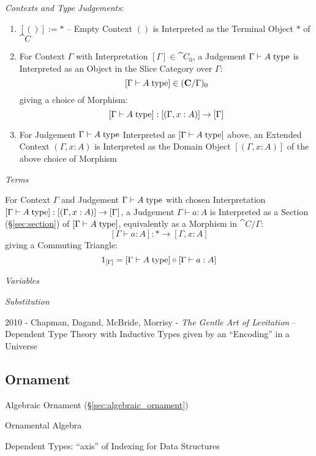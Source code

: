 \emph{Contexts and Type Judgements}:
\begin{enumerate}
  \item $[()] := *$ -- Empty Context $()$ is Interpreted as the
    Terminal Object $*$ of $\cat{C}$
  \item For Context $\Gamma$ with Interpretation $[\Gamma] \in
    \cat{C}_0$, a Judgement $\Gamma \vdash A\;\mathrm{type}$ is Interpreted
    as an Object in the Slice Category over $\Gamma$:
    \[
      [\Gamma \vdash A\;\mathrm{type}] \in (\mathbf{C}/\Gamma)_0
    \]
    giving a choice of Morphism:
    \[
      [\Gamma \vdash A\;\mathrm{type}] : [(\Gamma,x:A)] \rightarrow [\Gamma]
    \]
  \item For Judgement $\Gamma \vdash A\;\mathrm{type}$ Interpreted as $[\Gamma
    \vdash A\;\mathrm{type}]$ above, an Extended Context $(\Gamma,x:A)$ is
    Interpreted as the Domain Object $[(\Gamma,x:A)]$ of the above
    choice of Morphism
\end{enumerate}

\emph{Terms}

For Context $\Gamma$ and Judgement $\Gamma \vdash A\;\mathrm{type}$ with chosen
Interpretation $[\Gamma \vdash A\;\mathrm{type}] : [(\Gamma,x:A)] \rightarrow
[\Gamma]$, a Judgement $\Gamma \vdash a:A$ is Interpreted as a Section
(\S\ref{sec:section}) of $[\Gamma \vdash A\;\mathrm{type}]$, equivalently as a
Morphism in $\cat{C}/\Gamma$:
\[
  [\Gamma \vdash a:A]: * \rightarrow [\Gamma,x:A]
\]
giving a Commuting Triangle:
\[
  1_{[\Gamma]} = [\Gamma \vdash A\;\mathrm{type}] \circ [\Gamma \vdash a:A]
\]

\emph{Variables}

\emph{Substitution}


\asterism


2010 - Chapman, Dagand, McBride, Morrisy - \emph{The Gentle Art of Levitation}
-- Dependent Type Theory with Inductive Types given by an ``Encoding'' in a
Universe



\subsection{Ornament}\label{sec:ornament}

\cite{mcbride13}

Algebraic Ornament (\S\ref{sec:algebraic_ornament})

Ornamental Algebra

Dependent Types: ``axis'' of Indexing for Data Structures

